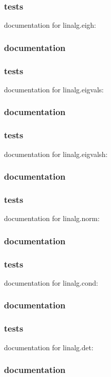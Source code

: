 \documentclass[a4paper,11pt]{article}
\begin{document}
\subsubsection{tests}
documentation for linalg.eigh:

\subsubsection{documentation}
\subsubsection{tests}
documentation for linalg.eigvals:

\subsubsection{documentation}
\subsubsection{tests}
documentation for linalg.eigvalsh:

\subsubsection{documentation}
\subsubsection{tests}
documentation for linalg.norm:

\subsubsection{documentation}
\subsubsection{tests}
documentation for linalg.cond:

\subsubsection{documentation}
\subsubsection{tests}
documentation for linalg.det:

\subsubsection{documentation}
\end{document}
